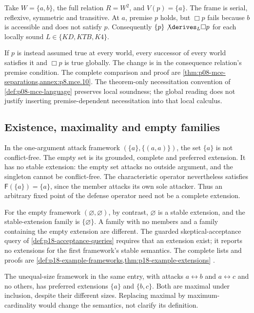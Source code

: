 Take \(W=\{a,b\}\), the full relation \(R=W^2\), and
\(V(p)=\{a\}\). The frame is serial, reflexive, symmetric and transitive.
At \(a\), premise \(p\) holds, but \(\Box p\) fails because \(b\)
is accessible and does not satisfy \(p\). Consequently
\(\{p\}\not\derives_L\Box p\) for each locally sound
\(L\in\{KD,KTB,K4\}\).

If \(p\) is instead assumed true at every world, every successor of every
world satisfies it and \(\Box p\) is true globally. The change is in
the consequence relation's premise condition. The complete comparison and
proof are \cref{thm:p08-mce-separations,annex:p8.mce.10}. The
theorem-only necessitation convention of \cref{def:p08-mce-language}
preserves local soundness; the global reading does not justify inserting
premise-dependent necessitation into that local calculus.

\subsection{Existence, maximality and empty families}
\label{sec:p14-counter-extensions}

In the one-argument attack framework \((\{a\},\{(a,a)\})\), the
set \(\{a\}\) is not conflict-free. The empty set is its grounded,
complete and preferred extension. It has no stable extension: the empty
set attacks no outside argument, and the singleton cannot be conflict-free.
The characteristic operator nevertheless satisfies
\(\mathsf F(\{a\})=\{a\}\), since the member attacks its own sole
attacker. Thus an arbitrary fixed point of the defense operator need not
be a complete extension.

For the empty framework \((\varnothing,\varnothing)\), by contrast,
\(\varnothing\) is a stable extension, and the stable-extension family
is \(\{\varnothing\}\). A family with no members and a family containing
the empty extension are different. The guarded skeptical-acceptance query
of \cref{def:p18-acceptance-queries} requires that an extension exist;
it reports no extensions for the first framework's stable semantics.
The complete lists and proofs are
\cref{def:p18-example-frameworks,thm:p18-example-extensions}
\cite{Dung1995}.

The unequal-size framework in the same entry, with attacks
\(a\leftrightarrow b\) and \(a\leftrightarrow c\) and no others,
has preferred extensions \(\{a\}\) and \(\{b,c\}\). Both are maximal
under inclusion, despite their different sizes. Replacing maximal by
maximum-cardinality would change the semantics, not clarify its definition.

